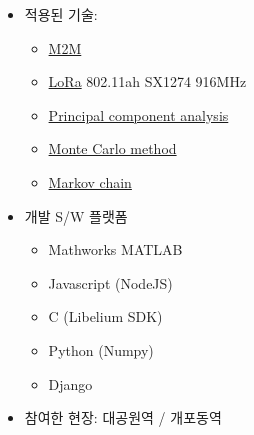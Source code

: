 \documentclass[10pt,a4paper,ragged2e]{altacv}
\begin{document}
\begin{fullwidth}
\begin{itemize}
\item 적용된 기술:
  \begin{itemize} 
    \item \href{https://en.wikipedia.org/wiki/Machine_to_machine}{M2M}
    \item \href{https://lora-alliance.org/}{LoRa} 802.11ah SX1274 916MHz
    \item \href{https://en.wikipedia.org/wiki/Principal_component_analysis}{Principal component analysis} 
    \item \href{https://en.wikipedia.org/wiki/Monte_Carlo_method}{Monte Carlo method}
    \item \href{https://en.wikipedia.org/wiki/Markov_chain}{Markov chain}
  \end{itemize}
\item 개발 S/W 플랫폼
  \begin{itemize}
    \item Mathworks MATLAB
    \item Javascript (NodeJS)
    \item C (Libelium SDK)
    \item Python (Numpy)
    \item Django
  \end{itemize}
\item 참여한 현장: 대공원역 / 개포동역
\end{itemize}

\divider



\end{fullwidth}
\end{document}
